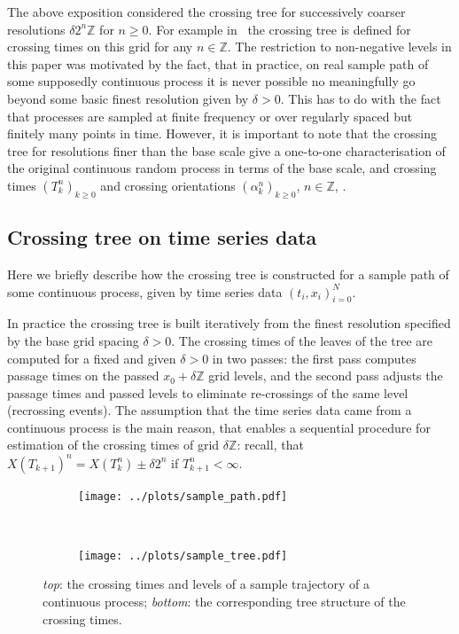 \documentclass[a4paper]{article}
\begin{document}
The above exposition considered the crossing tree for successively coarser resolutions
$\delta 2^n \mathbb{Z}$ for $n\geq0$. For example in~\cite{decrouez2013}
the crossing tree is defined for crossing times on this grid for any $n\in\mathbb{Z}$.
The restriction to non-negative levels in this paper was motivated by the fact,
that in practice, on real sample path of some supposedly continuous process it
is never possible no meaningfully go beyond some basic finest resolution given
by $\delta>0$. This has to do with the fact that processes are sampled at finite
frequency or over regularly spaced but finitely many points in time. However, it
is important to note that the crossing tree for resolutions finer than the base
scale give a one-to-one characterisation of the original continuous random process
in terms of the base scale, and crossing times $(T_k^n)_{k\geq 0}$ and crossing
orientations $(\alpha_k^n)_{k\geq 0}$, $n\in \mathbb{Z}$, \cite{decrouez2013, ECP1673}.


\subsection{Crossing tree on time series data} %
\label{sub:crossing_tree_on_time_series_data}

Here we briefly describe how the crossing tree is constructed for a sample
path of some continuous process, given by time series data $(t_i, x_i)_{i=0}^N$.

In practice the crossing tree is built iteratively from the finest resolution
specified by the base grid spacing $\delta > 0$. The crossing times of the leaves
of the tree are computed for a fixed and given $\delta>0$ in two passes: the first
pass computes passage times on the passed $x_0+\delta \mathbb{Z}$ grid levels, and
the second pass adjusts the passage times and passed levels to eliminate re-crossings
of the same level (recrossing events). The assumption that the time series data
came from a continuous process is the main reason, that enables a sequential procedure
for estimation of the crossing times of grid $\delta\mathbb{Z}$: recall, that
$X(T_{k+1})^n = X(T_k^n) \pm\delta2^n$ if $T_{k+1}^n<\infty$.

\begin{figure}[ht]
    \centering
    \begin{subfigure}{\linewidth}
        \texttt{[image: ../plots/sample\_path.pdf]}
    \end{subfigure}\\
    \vspace{-20pt}
    \begin{subfigure}{\linewidth}
        \texttt{[image: ../plots/sample\_tree.pdf]}
    \end{subfigure}
    \vspace{-10pt}
    \caption{\emph{top}: the crossing times and levels of a sample trajectory of
    a continuous process; \emph{bottom}: the corresponding tree structure of the
    crossing times.}
    \label{fig:sample_tree}
\end{figure}
\end{document}
